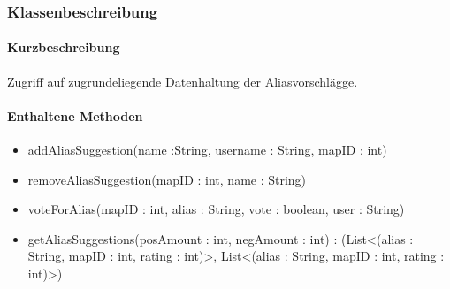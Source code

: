 \subsubsection*{Klassenbeschreibung}%
\paragraph*{Kurzbeschreibung}
Zugriff auf zugrundeliegende Datenhaltung der Aliasvorschlägge.
\paragraph*{Enthaltene Methoden}
\begin{itemize}
    \item addAliasSuggestion(name :String, username : String, mapID : int)
    \item removeAliasSuggestion(mapID : int, name : String)
    \item voteForAlias(mapID : int, alias : String, vote : boolean, user : String)
    \item getAliasSuggestions(posAmount : int, negAmount : int) : (List<(alias : String, mapID : int, rating : int)>, List<(alias : String, mapID : int, rating : int)>)
\end{itemize}
